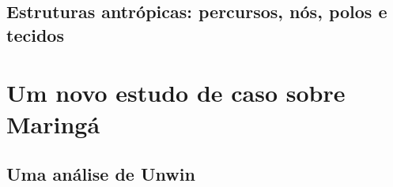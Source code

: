 \documentclass[]{report}
\begin{document}
\section{Estruturas antrópicas: percursos, nós, polos e tecidos}

	\chapter{Um novo estudo de caso sobre Maringá}
	\section{Uma análise de Unwin}
\end{document}
